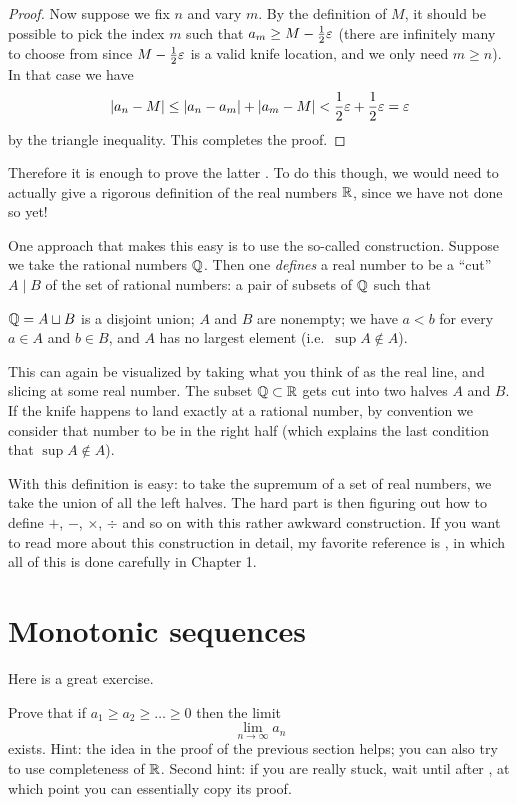 \begin{proof}
	Now suppose we fix $n$ and vary $m$.
	By the definition of $M$,
	it should be possible to pick the index $m$
	such that $a_m \ge M - \frac{1}{2} \varepsilon$
	(there are infinitely many to choose from
	since $M - \frac{1}{2}\varepsilon$ is a valid knife location,
	and we only need $m \ge n$).
	In that case we have
	\[ \left\lvert a_n - M \right\rvert
		\le \left\lvert a_n - a_m \right\rvert
		+ \left\lvert a_m - M \right\rvert <
		\frac{1}{2}\varepsilon + \frac{1}{2}\varepsilon = \varepsilon \]
	by the triangle inequality.
	This completes the proof.
\end{proof}

Therefore it is enough to prove the latter .
To do this though, we would need to actually give a rigorous definition of
the real numbers $\mathbb R$, since we have not done so yet!

One approach that makes this easy is to use the so-called
 construction.
Suppose we take the rational numbers $\mathbb Q$.
Then one \emph{defines} a real number to be a ``cut''
$A \mid B$ of the set of rational numbers:
a pair of subsets of $\mathbb Q$ such that
\begin{itemize}
	\ii $\mathbb Q = A \sqcup B$ is a disjoint union;
	\ii $A$ and $B$ are nonempty;
	\ii we have $a < b$ for every $a \in A$ and $b \in B$, and
	\ii $A$ has no largest element (i.e.\ $\sup A \notin A$).
\end{itemize}
This can again be visualized by taking what you think of
as the real line, and slicing at some real number.
The subset $\mathbb Q \subset \mathbb R$ gets cut into two halves $A$ and $B$.
If the knife happens to land exactly at a rational number,
by convention we consider that number to be in the right half
(which explains the last condition that $\sup A \notin A$).

With this definition  is easy:
to take the supremum of a set of real numbers,
we take the union of all the left halves.
The hard part is then figuring out how to define $+$, $-$, $\times$, $\div$
and so on with this rather awkward construction.
If you want to read more about this construction in detail,
my favorite reference is \cite{ref:pugh},
in which all of this is done carefully in Chapter 1.

\section{Monotonic sequences}
Here is a great exercise.
\begin{exercise}
	[Mandatory]
	\label{exer:inf_exists}
	Prove that if $a_1 \ge a_2 \ge \dots \ge 0$
	then the limit
	\[ \lim_{n \to \infty} a_n \]
	exists.
	Hint: the idea in the proof of the previous section helps;
	you can also try to use completeness of $\mathbb R$.
	Second hint: if you are really stuck,
	wait until after ,
	at which point you can essentially copy its proof.
\end{exercise}

